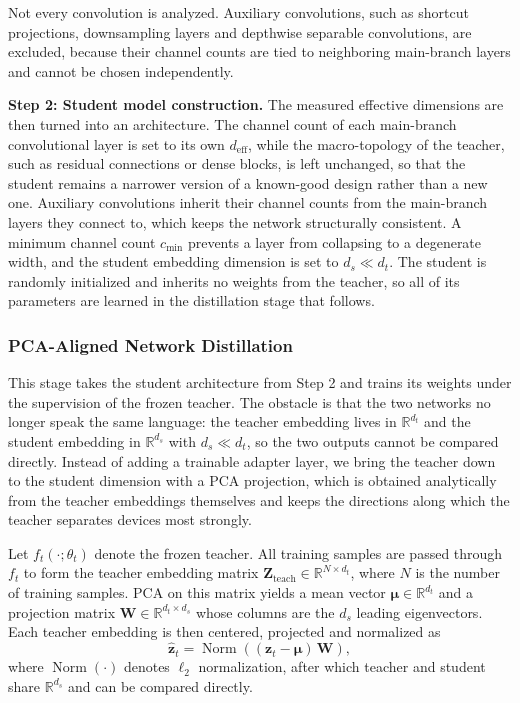 \documentclass[journal,comsoc]{IEEEtran}
\begin{document}
Not every convolution is analyzed.
Auxiliary convolutions, such as shortcut projections, downsampling layers and depthwise separable convolutions, are excluded, because their channel counts are tied to neighboring main-branch layers and cannot be chosen independently.

\textbf{Step 2: Student model construction.}
The measured effective dimensions are then turned into an architecture.
The channel count of each main-branch convolutional layer is set to its own $d_{\text{eff}}$, while the macro-topology of the teacher, such as residual connections or dense blocks, is left unchanged, so that the student remains a narrower version of a known-good design rather than a new one.
Auxiliary convolutions inherit their channel counts from the main-branch layers they connect to, which keeps the network structurally consistent.
A minimum channel count $c_{\min}$ prevents a layer from collapsing to a degenerate width, and the student embedding dimension is set to $d_s \ll d_t$.
The student is randomly initialized and inherits no weights from the teacher, so all of its parameters are learned in the distillation stage that follows.

\subsubsection{PCA-Aligned Network Distillation}

This stage takes the student architecture from Step 2 and trains its weights under the supervision of the frozen teacher.
The obstacle is that the two networks no longer speak the same language: the teacher embedding lives in $\mathbb{R}^{d_t}$ and the student embedding in $\mathbb{R}^{d_s}$ with $d_s \ll d_t$, so the two outputs cannot be compared directly.
Instead of adding a trainable adapter layer, we bring the teacher down to the student dimension with a PCA projection, which is obtained analytically from the teacher embeddings themselves and keeps the directions along which the teacher separates devices most strongly.

Let $f_t(\cdot;\theta_t)$ denote the frozen teacher.
All training samples are passed through $f_t$ to form the teacher embedding matrix $\mathbf{Z}_{\text{teach}} \in \mathbb{R}^{N \times d_t}$, where $N$ is the number of training samples.
PCA on this matrix yields a mean vector $\boldsymbol{\mu} \in \mathbb{R}^{d_t}$ and a projection matrix $\mathbf{W} \in \mathbb{R}^{d_t \times d_s}$ whose columns are the $d_s$ leading eigenvectors.
Each teacher embedding is then centered, projected and normalized as
\begin{equation}
\label{eq:proj}
\hat{\mathbf{z}}_t =
\operatorname{Norm}\!\left(
(\mathbf{z}_t - \boldsymbol{\mu}) \, \mathbf{W}
\right),
\end{equation}
where $\operatorname{Norm}(\cdot)$ denotes $\ell_2$ normalization, after which teacher and student share $\mathbb{R}^{d_s}$ and can be compared directly.
\end{document}
